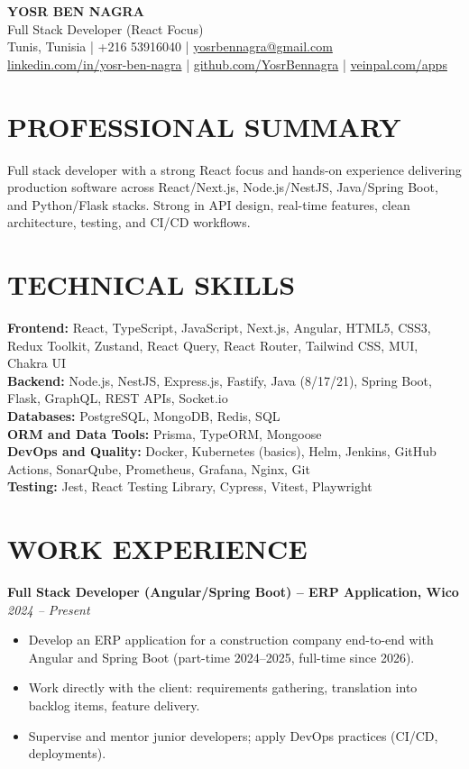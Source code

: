\documentclass[10pt,a4paper]{article}
\begin{document}
\begin{center}
{\LARGE \textbf{YOSR BEN NAGRA}}\\
Full Stack Developer (React Focus)\\
Tunis, Tunisia \;|\; +216 53916040 \;|\; \href{mailto:yosrbennagra@gmail.com}{yosrbennagra@gmail.com}\\
\href{https://www.linkedin.com/in/yosr-ben-nagra/}{linkedin.com/in/yosr-ben-nagra} \;|\;
\href{https://github.com/YosrBennagra}{github.com/YosrBennagra} \;|\;
\href{https://veinpal.com/apps}{veinpal.com/apps}
\end{center}

\section*{PROFESSIONAL SUMMARY}
Full stack developer with a strong React focus and hands-on experience delivering production software across React/Next.js, Node.js/NestJS, Java/Spring Boot, and Python/Flask stacks. Strong in API design, real-time features, clean architecture, testing, and CI/CD workflows.

\section*{TECHNICAL SKILLS}
\textbf{Frontend:} React, TypeScript, JavaScript, Next.js, Angular, HTML5, CSS3, Redux Toolkit, Zustand, React Query, React Router, Tailwind CSS, MUI, Chakra UI\\
\textbf{Backend:} Node.js, NestJS, Express.js, Fastify, Java (8/17/21), Spring Boot, Flask, GraphQL, REST APIs, Socket.io\\
\textbf{Databases:} PostgreSQL, MongoDB, Redis, SQL\\
\textbf{ORM and Data Tools:} Prisma, TypeORM, Mongoose\\
\textbf{DevOps and Quality:} Docker, Kubernetes (basics), Helm, Jenkins, GitHub Actions, SonarQube, Prometheus, Grafana, Nginx, Git\\
\textbf{Testing:} Jest, React Testing Library, Cypress, Vitest, Playwright

\section*{WORK EXPERIENCE}
\textbf{Full Stack Developer (Angular/Spring Boot) -- ERP Application, Wico} \hfill \textit{2024 -- Present}
\begin{itemize}
  \item Develop an ERP application for a construction company end-to-end with Angular and Spring Boot (part-time 2024--2025, full-time since 2026).
  \item Work directly with the client: requirements gathering, translation into backlog items, feature delivery.
  \item Supervise and mentor junior developers; apply DevOps practices (CI/CD, deployments).
\end{itemize}
\end{document}
